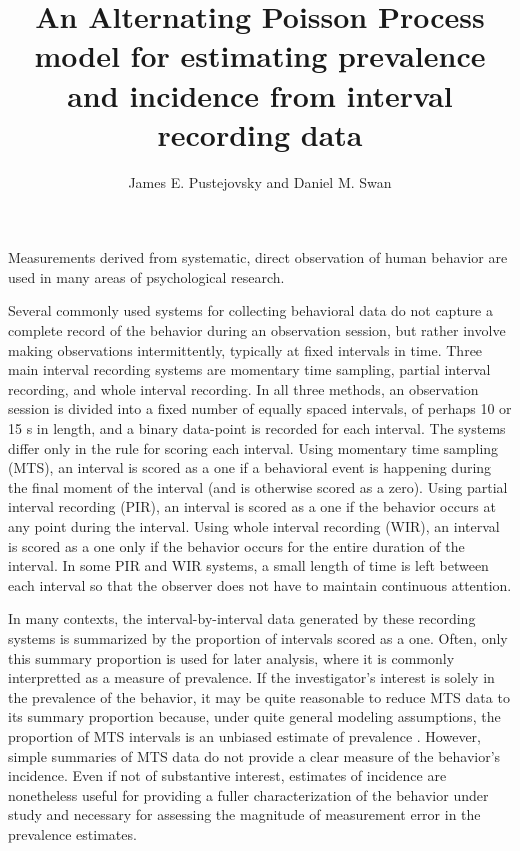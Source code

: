 \documentclass[man, noextraspace, floatsintext]{apa6}\usepackage[]{graphicx}\usepackage[]{color}
\title{An Alternating Poisson Process model for estimating prevalence and incidence from interval recording data}
\author{James E. Pustejovsky and Daniel M. Swan}
\affiliation{The University of Texas at Austin}
\begin{document}
\maketitle

Measurements derived from systematic, direct observation of human behavior are used in many areas of psychological research.


Several commonly used systems for collecting behavioral data do not capture a complete record of the behavior during an observation session, but rather involve making observations intermittently, typically at fixed intervals in time. Three main interval recording systems are momentary time sampling, partial interval recording, and whole interval recording. In all three methods, an observation session is divided into a fixed number of equally spaced intervals, of perhaps 10 or 15 s in length, and a binary data-point is recorded for each interval. The systems differ only in the rule for scoring each interval. Using momentary time sampling (MTS), an interval is scored as a one if a behavioral event is happening during the final moment of the interval (and is otherwise scored as a zero). Using partial interval recording (PIR), an interval is scored as a one if the behavior occurs at any point during the interval. Using whole interval recording (WIR), an interval is scored as a one only if the behavior occurs for the entire duration of the interval. In some PIR and WIR systems, a small length of time is left between each interval so that the observer does not have to maintain continuous attention. 

In many contexts, the interval-by-interval data generated by these recording systems is summarized by the proportion of intervals scored as a one. Often, only this summary proportion is used for later analysis, where it is commonly interpretted as a measure of prevalence. If the investigator's interest is solely in the prevalence of the behavior, it may be quite reasonable to reduce MTS data to its summary proportion because, under quite general modeling assumptions, the proportion of MTS intervals is an unbiased estimate of prevalence \citep{Rogosa1991statistical}. However, simple summaries of MTS data do not provide a clear measure of the behavior's incidence. Even if not of substantive interest, estimates of incidence are nonetheless useful for providing a fuller characterization of the behavior under study and necessary for assessing the magnitude of measurement error in the prevalence estimates. 
\end{document}
